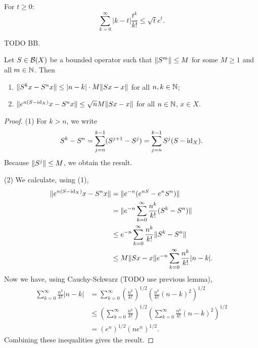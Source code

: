 \begin{lemma}
For $t\geq 0$:
\[ \sum_{k=0}^\infty |k-t| \frac{t^k}{k!}\leq \sqrt{t}e^t. \]
\end{lemma}
TODO BB.

\begin{lemma} \label{sqrtNlemma}
Let $S\in\operatorname{\mathcal{B}}(X)$ be a bounded operator such that $\lVert S^m\rVert\leq M$ for some $M\geq 1$ and all $m\in \mathbb{N}$. Then
\begin{enumerate}
\item $\lVert S^kx - S^nx\rVert \leq |n-k|\cdot M\lVert Sx-x\rVert$ for all $n,k\in\mathbb{N}$;
\item $\lVert e^{n(S-\operatorname{id}_X)}x-S^nx\rVert \leq \sqrt{n}M\lVert Sx - x\rVert$ for all $n\in\mathbb{N}$, $x\in X$.
\end{enumerate}
\end{lemma}
\begin{proof}
(1) For $k>n$, we write
\[ S^k - S^n = \sum_{j=n}^{k-1}(S^{j+1}- S^j) = \sum_{j=n}^{k-1}S^j(S- \operatorname{id}_X).  \]
Because $\lVert S^j\rVert\leq M$, we obtain the result.

(2) We calculate, using (1),
\begin{align*}
\lVert e^{n(S-\operatorname{id}_X)}x-S^nx\rVert &= \lVert e^{-n}(e^{nS}-e^n S^n)\rVert \\
&= \lVert e^{-n}\sum_{k=0}^\infty\frac{n^k}{k!}(S^k-S^n)\rVert \\
&\leq e^{-n}\sum_{k=0}^\infty\frac{n^k}{k!} \lVert S^k - S^n\rVert \\
&\leq  M\lVert Sx-x\rVert e^{-n}\sum_{k=0}^\infty\frac{n^k}{k!} |n-k|.
\end{align*}
Now we have, using Cauchy-Schwarz (TODO use previous lemma),
\begin{align*}
\sum_{k=0}^\infty\frac{n^k}{k!} |n-k| &= \sum_{k=0}^\infty\left(\frac{n^k}{k!}\right)^{1/2}\left(\frac{n^k}{k!}(n-k)^2\right)^{1/2} \\
&\leq \left(\sum_{k=0}^\infty\frac{n^k}{k!}\right)^{1/2}\left(\sum_{k=0}^\infty\frac{n^k}{k!}(n-k)^2\right)^{1/2} \\
&= (e^n)^{1/2}(ne^n)^{1/2}.
\end{align*}
Combining these inequalities gives the result.
\end{proof}


